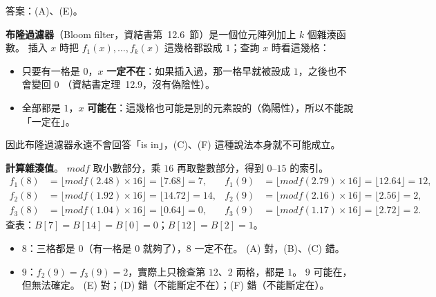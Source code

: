 \begin{pastsoln}
答案：(A)、(E)。

\textbf{布隆過濾器}（Bloom filter，資結書第~12.6~節）是一個位元陣列加上 $k$ 個雜湊函數。 插入 $x$ 時把
$f_1(x), \ldots, f_k(x)$ 這幾格都設成 $1$；查詢 $x$ 時看這幾格：
\begin{itemize}
\item 只要有一格是 $0$，$x$ \textbf{一定不在}：如果插入過，那一格早就被設成 $1$，之後也不會變回 $0$
（資結書定理~12.9，沒有偽陰性）。
\item 全部都是 $1$，$x$ \textbf{可能在}：這幾格也可能是別的元素設的（偽陽性），所以不能說「一定在」。
\end{itemize}
因此布隆過濾器永遠不會回答「is in」，(C)、(F) 這種說法本身就不可能成立。

\textbf{計算雜湊值}。 $\mathit{modf}$ 取小數部分，乘 $16$ 再取整數部分，得到 $0$--$15$ 的索引。
\begin{align*}
f_1(8) &= \lfloor \mathit{modf}(2.48) \times 16 \rfloor = \lfloor 7.68 \rfloor = 7, &
f_1(9) &= \lfloor \mathit{modf}(2.79) \times 16 \rfloor = \lfloor 12.64 \rfloor = 12, \\
f_2(8) &= \lfloor \mathit{modf}(1.92) \times 16 \rfloor = \lfloor 14.72 \rfloor = 14, &
f_2(9) &= \lfloor \mathit{modf}(2.16) \times 16 \rfloor = \lfloor 2.56 \rfloor = 2, \\
f_3(8) &= \lfloor \mathit{modf}(1.04) \times 16 \rfloor = \lfloor 0.64 \rfloor = 0, &
f_3(9) &= \lfloor \mathit{modf}(1.17) \times 16 \rfloor = \lfloor 2.72 \rfloor = 2.
\end{align*}
查表：$B[7] = B[14] = B[0] = 0$；$B[12] = B[2] = 1$。
\begin{itemize}
\item $8$：三格都是 $0$（有一格是 $0$ 就夠了），$8$ 一定不在。 (A) 對，(B)、(C) 錯。
\item $9$：$f_2(9) = f_3(9) = 2$，實際上只檢查第 $12$、$2$ 兩格，都是 $1$。 $9$ 可能在，但無法確定。
(E) 對；(D) 錯（不能斷定不在）；(F) 錯（不能斷定在）。
\end{itemize}
\end{pastsoln}
